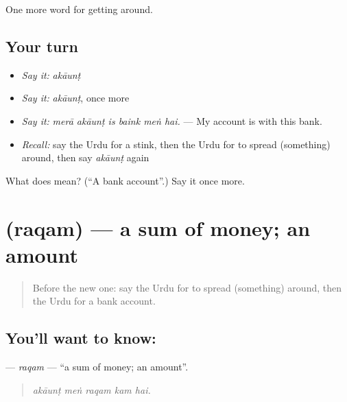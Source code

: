 \begin{grammarlens}[title={What you've built}]
One more word for getting around.
\end{grammarlens}

\subsection*{Your turn}
\begin{itemize}
\raggedright
  \item \emph{Say it:} \emph{akāunṭ}
  \item \emph{Say it:} \emph{akāunṭ}, once more
  \item \emph{Say it:} \emph{merā akāunṭ is baink meṅ hai.} — My account is with this bank.
  \item \emph{Recall:} say the Urdu for a stink, then the Urdu for to spread (something) around, then say \emph{akāunṭ} again
\end{itemize}

\begin{tcolorbox}[breakable,colback=teal!4,colframe=teal!35!black,title={Before you move on}]
What does  mean? (\textquotedblleft{}A bank account\textquotedblright{}.) Say it once more.
\end{tcolorbox}
\section[\texorpdfstring{\ur{رقم} (raqam)}{رقم (raqam)}]{ (raqam) — a sum of money; an amount}

\label{lesson:UR-C417-raqam}



\begin{quote}
Before the new one: say the Urdu for to spread (something) around, then the Urdu for a bank account.
\end{quote}

\subsection*{You'll want to know: }
\textbf{} — \emph{raqam} — \textquotedblleft{}a sum of money; an amount\textquotedblright{}.

\begin{quote}
    
\end{quote}

\begin{quote}
\emph{akāunṭ meṅ raqam kam hai.}
\end{quote}

